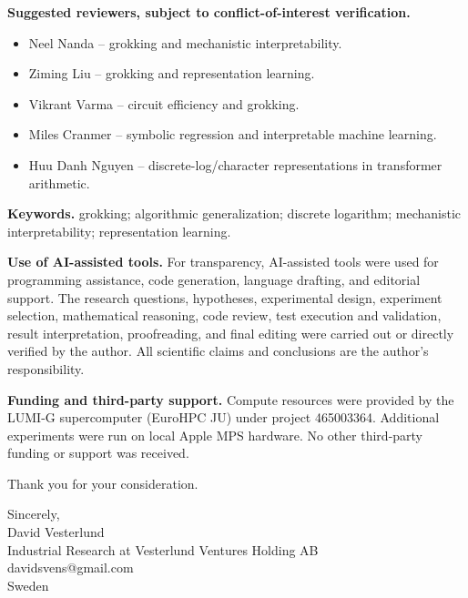 \documentclass[11pt]{article}
\begin{document}
\textbf{Suggested reviewers, subject to conflict-of-interest verification.}
\begin{itemize}
  \item Neel Nanda -- grokking and mechanistic interpretability.
  \item Ziming Liu -- grokking and representation learning.
  \item Vikrant Varma -- circuit efficiency and grokking.
  \item Miles Cranmer -- symbolic regression and interpretable machine learning.
  \item Huu Danh Nguyen -- discrete-log/character representations in transformer arithmetic.
\end{itemize}

\textbf{Keywords.} grokking; algorithmic generalization; discrete logarithm; mechanistic interpretability; representation learning.

\textbf{Use of AI-assisted tools.} For transparency, AI-assisted tools were used for programming assistance, code generation, language drafting, and editorial support. The research questions, hypotheses, experimental design, experiment selection, mathematical reasoning, code review, test execution and validation, result interpretation, proofreading, and final editing were carried out or directly verified by the author. All scientific claims and conclusions are the author's responsibility.

\textbf{Funding and third-party support.} Compute resources were provided by the LUMI-G supercomputer (EuroHPC JU) under project 465003364. Additional experiments were run on local Apple MPS hardware. No other third-party funding or support was received.

Thank you for your consideration.

Sincerely,\\[1.5em]
David Vesterlund\\
Industrial Research at Vesterlund Ventures Holding AB\\
davidsvens@gmail.com\\
Sweden
\end{document}
